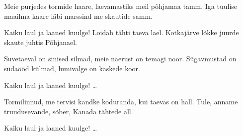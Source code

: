 Meie purjedes tormide haare,
laevamastiks meil p\~ohjamaa tamm.
Iga tuulise maailma kaare
l\"abi marssind me skautide samm.

Kaiku laul ja laaned kuulge!
Loidab t\"ahti taeva lael.
Kotkaj\"arve l\~okke juurde
skaute juhtis P\~ohjanael.

Suvetaeval on sinised silmad,
meie naerust on temagi noor.
S\"ugavmustad on s\"uda\"o\"od k\"ulmad,
lumivalge on kaskede koor.

Kaiku laul ja laaned kuulge! \ldots

Tormilinnud, me tervisi kandke
koduranda, kui taevas on hall.
Tule, anname truudusevande,
s\~ober, Kanada t\"ahtede all.

Kaiku laul ja laaned kuulge! \ldots